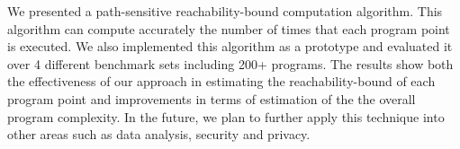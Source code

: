 We presented a path-sensitive reachability-bound computation algorithm.
This algorithm can compute accurately the number of times that each program point is executed.
We also implemented this algorithm as a prototype and evaluated it over 4 different benchmark sets including 200+ programs.
The results show both the effectiveness of our approach in estimating the reachability-bound of each program point and improvements in terms of estimation of the the overall program complexity. 
In the future, we plan to further apply this technique into other areas such as data analysis, security and privacy.
